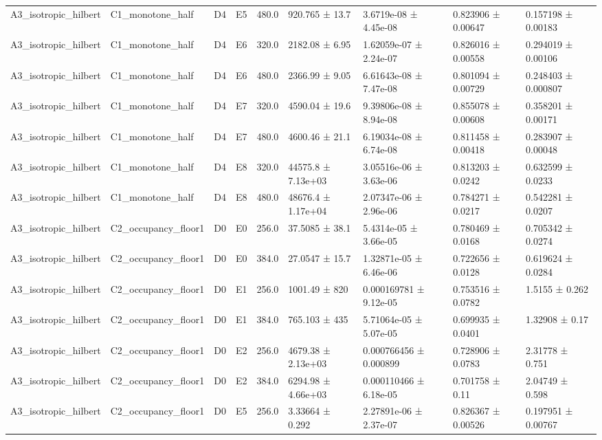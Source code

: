 \begin{table}
\begin{tabular}{lllllllll}
A3\_isotropic\_hilbert & C1\_monotone\_half & D4 & E5 & 480.0 & 920.765 ± 13.7 & 3.6719e-08 ± 4.45e-08 & 0.823906 ± 0.00647 & 0.157198 ± 0.00183 \\
A3\_isotropic\_hilbert & C1\_monotone\_half & D4 & E6 & 320.0 & 2182.08 ± 6.95 & 1.62059e-07 ± 2.24e-07 & 0.826016 ± 0.00558 & 0.294019 ± 0.00106 \\
A3\_isotropic\_hilbert & C1\_monotone\_half & D4 & E6 & 480.0 & 2366.99 ± 9.05 & 6.61643e-08 ± 7.47e-08 & 0.801094 ± 0.00729 & 0.248403 ± 0.000807 \\
A3\_isotropic\_hilbert & C1\_monotone\_half & D4 & E7 & 320.0 & 4590.04 ± 19.6 & 9.39806e-08 ± 8.94e-08 & 0.855078 ± 0.00608 & 0.358201 ± 0.00171 \\
A3\_isotropic\_hilbert & C1\_monotone\_half & D4 & E7 & 480.0 & 4600.46 ± 21.1 & 6.19034e-08 ± 6.74e-08 & 0.811458 ± 0.00418 & 0.283907 ± 0.00048 \\
A3\_isotropic\_hilbert & C1\_monotone\_half & D4 & E8 & 320.0 & 44575.8 ± 7.13e+03 & 3.05516e-06 ± 3.63e-06 & 0.813203 ± 0.0242 & 0.632599 ± 0.0233 \\
A3\_isotropic\_hilbert & C1\_monotone\_half & D4 & E8 & 480.0 & 48676.4 ± 1.17e+04 & 2.07347e-06 ± 2.96e-06 & 0.784271 ± 0.0217 & 0.542281 ± 0.0207 \\
A3\_isotropic\_hilbert & C2\_occupancy\_floor1 & D0 & E0 & 256.0 & 37.5085 ± 38.1 & 5.4314e-05 ± 3.66e-05 & 0.780469 ± 0.0168 & 0.705342 ± 0.0274 \\
A3\_isotropic\_hilbert & C2\_occupancy\_floor1 & D0 & E0 & 384.0 & 27.0547 ± 15.7 & 1.32871e-05 ± 6.46e-06 & 0.722656 ± 0.0128 & 0.619624 ± 0.0284 \\
A3\_isotropic\_hilbert & C2\_occupancy\_floor1 & D0 & E1 & 256.0 & 1001.49 ± 820 & 0.000169781 ± 9.12e-05 & 0.753516 ± 0.0782 & 1.5155 ± 0.262 \\
A3\_isotropic\_hilbert & C2\_occupancy\_floor1 & D0 & E1 & 384.0 & 765.103 ± 435 & 5.71064e-05 ± 5.07e-05 & 0.699935 ± 0.0401 & 1.32908 ± 0.17 \\
A3\_isotropic\_hilbert & C2\_occupancy\_floor1 & D0 & E2 & 256.0 & 4679.38 ± 2.13e+03 & 0.000766456 ± 0.000899 & 0.728906 ± 0.0783 & 2.31778 ± 0.751 \\
A3\_isotropic\_hilbert & C2\_occupancy\_floor1 & D0 & E2 & 384.0 & 6294.98 ± 4.66e+03 & 0.000110466 ± 6.18e-05 & 0.701758 ± 0.11 & 2.04749 ± 0.598 \\
A3\_isotropic\_hilbert & C2\_occupancy\_floor1 & D0 & E5 & 256.0 & 3.33664 ± 0.292 & 2.27891e-06 ± 2.37e-07 & 0.826367 ± 0.00526 & 0.197951 ± 0.00767 \\

\end{tabular}
\end{table}
